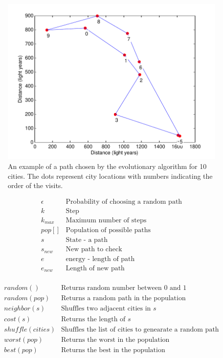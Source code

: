 \documentclass[letterpaper, 11 pt]{article}
\begin{document}
\begin{figure}[b]
	\centering
	\includegraphics[scale=0.6]{../figures/path_evo_T10.pdf}
	\caption{\small	An example of a path chosen by the evolutionary algorithm
					for 10 cities.  The dots represent city locations with 
					numbers indicating the order of the visits.
			}
	\label{fig:pathevo}
\end{figure}


\[
\begin{array}{c|l}
\epsilon & \textrm{Probability of choosing a random path}\\
k & \textrm{Step}\\
k_{max} & \textrm{Maximum number of steps}\\
pop[] & \textrm{Population of possible paths}\\
s & \textrm{State - a path}\\
s_{new} & \textrm{New path to check}\\
e & \textrm{energy - length of path}\\
e_{new} & \textrm{Length of new path}\\
\end{array}\]

\[
\begin{array}{c|l}
random() & \textrm{Returns random number between 0 and 1}\\
random(pop) & \textrm{Returns a random path in the population}\\
neighbor(s) & \textrm{Shuffles two adjacent cities in }s\\
cost(s) & \textrm{Returns the length of }s\\
shuffle(cities) & \textrm{Shuffles the list of cities to genearate a random path}\\
worst(pop) & \textrm{Returns the worst in the population}\\
best(pop) & \textrm{Returns the best in the population}\\
\end{array}\]
\end{document}
